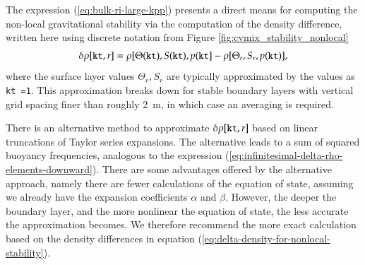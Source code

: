 The expression (\ref{eq:bulk-ri-large-kpp}) presents a direct means
for computing the non-local gravitational stability via the
computation of the density difference, written here using discrete
notation from Figure  \ref{fig:cvmix_stability_nonlocal}
\begin{equation}
 \delta\rho[{\tt kt},r]  = \rho[\Theta({\tt kt}), S({\tt kt}), p({\tt kt} ]  -\rho[\Theta_{r}, S_{r}, p({\tt kt})],
\label{eq:delta-density-for-nonlocal-stability}
\end{equation}
where the surface layer values $\Theta_{r}, S_{r}$ are typically
approximated by the values as {\tt kt =1}.  This approximation breaks
down for stable boundary layers with vertical grid spacing finer than
roughly 2~m, in which case an averaging is required.

There is an alternative method to approximate $\delta\rho[{\tt kt},r]$
based on linear truncations of Taylor series expansions.  The
alternative leads to a sum of squared buoyancy frequencies, analogous
to the expression
(\ref{eq:infinitesimal-delta-rho-elements-downward}).  There are some
advantages offered by the alternative approach, namely there are fewer
calculations of the equation of state, assuming we already have the
expansion coefficients $\alpha$ and $\beta$.  However, the deeper the
boundary layer, and the more nonlinear the equation of state, the less
accurate the approximation becomes.  We therefore recommend the more
exact calculation based on the density differences in equation
(\ref{eq:delta-density-for-nonlocal-stability}).

